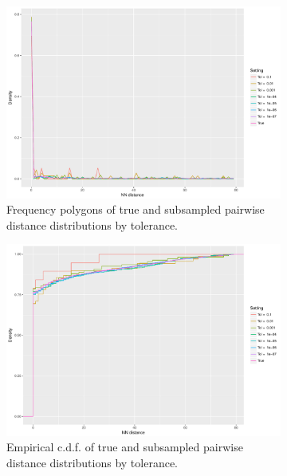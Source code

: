 \documentclass{article}
\begin{document}
\begin{figure}
    \begin{subfigure}{.5\textwidth}
        \includegraphics[width=\linewidth]{Figures/NearestNeighbor/Sequence/freqpoly_by_tol.pdf}
   		\caption{Frequency polygons of true and subsampled pairwise distance distributions by tolerance.}
    	\label{fig:NNFreqPolySequence}
    \end{subfigure}
    \begin{subfigure}{.5\textwidth}
        \includegraphics[width=\linewidth]{Figures/NearestNeighbor/Sequence/ecdf_by_tol.pdf}
    	\caption{Empirical c.d.f. of true and subsampled pairwise distance distributions by tolerance.}
    	\label{fig:NNECDFSequence}
    \end{subfigure}
    \begin{subfigure}{.5\textwidth}

\end{subfigure}
\end{figure}
\end{document}
